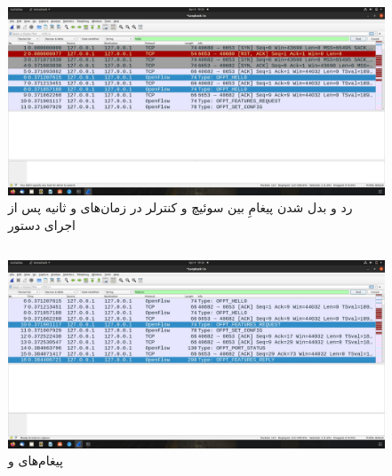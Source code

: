\documentclass{article}
\begin{document}
\subsection{}
\begin{figure}[H]
    \centering
    \includegraphics[width=1.0\textwidth]{figures/1b.jpg}
    \caption
	{
رد و بدل شدن پیغامِ  بین سوئیچ و کنترلر در زمان‌های  و  ثانیه پس از اجرای دستور
	}
    \label{fig:fig1}
\end{figure}

\subsection{}
\begin{figure}[H]
    \centering
    \includegraphics[width=1.0\textwidth]{figures/1c.jpg}
    \caption
	{
پیغام‌های  و 
	}
    \label{fig:fig1}
\end{figure}
\end{document}
